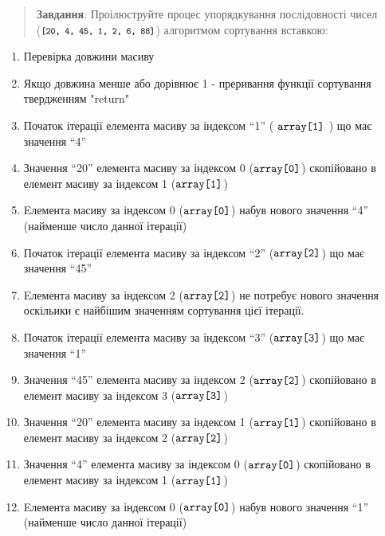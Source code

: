 \begin{center}
  \Large{}
\end{center}


\begin{quote}
  \textbf{Завдання}: Проілюструйте процес упорядкування послідовності чисел \\ ($\footnotesize\texttt{[20, 4, 45, 1, 2, 6, 88]}$) алгоритмом сортування вставкою:
\end{quote}

\begin{enumerate}
  \item Перевірка довжини масиву
  \item Якщо довжина менше або дорівнює 1 - преривання функції сортування твердженням "return"
  \item Початок ітерації елемента масиву за індексом ``1'' ( $\normalsize\texttt{array[1]}$ ) що має значення ``4''
  \item Значення ``20'' елемента масиву за індексом 0 ($\normalsize\texttt{array[0]}$) скопійовано в елемент масиву за індексом 1 ($\normalsize\texttt{array[1]}$)
  \item Eлемента масиву за індексом 0 ($\normalsize\texttt{array[0]}$) набув нового значення ``4'' (найменше число данної ітерації)
  \item Початок ітерації елемента масиву за індексом ``2'' ($\normalsize\texttt{array[2]}$) що має значення ``45''
  \item Eлемента масиву за індексом 2 ($\normalsize\texttt{array[2]}$) не потребує нового значення оскільики є найбішим значенням сортування цієї ітерації.
  \item Початок ітерації елемента масиву за індексом ``3'' ($\normalsize\texttt{array[3]}$) що має значення ``1''
  \item Значення ``45'' елемента масиву за індексом 2 ($\normalsize\texttt{array[2]}$) скопійовано в елемент масиву за індексом 3 ($\normalsize\texttt{array[3]}$)
  \item Значення ``20'' елемента масиву за індексом 1 ($\normalsize\texttt{array[1]}$) скопійовано в елемент масиву за індексом 2 ($\normalsize\texttt{array[2]}$)
  \item Значення ``4'' елемента масиву за індексом 0 ($\normalsize\texttt{array[0]}$) скопійовано в елемент масиву за індексом 1 ($\normalsize\texttt{array[1]}$)
  \item Eлемента масиву за індексом 0 ($\normalsize\texttt{array[0]}$) набув нового значення ``1'' (найменше число данної ітерації)

\end{enumerate}
